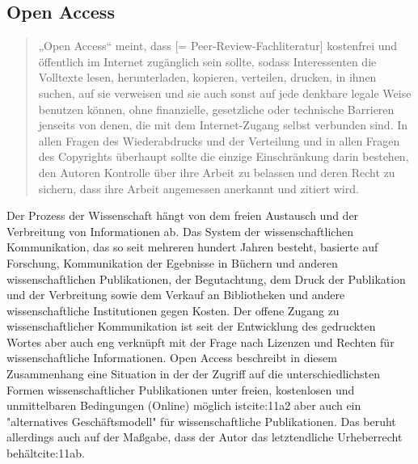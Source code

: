 \subsection{Open Access} 
\begin{quote}
„Open Access“ meint, dass [= Peer-Review-Fachliteratur] kostenfrei und öffentlich im Internet zugänglich sein sollte, sodass Interessenten die Volltexte lesen, herunterladen, kopieren, verteilen, drucken, in ihnen suchen, auf sie verweisen und sie auch sonst auf jede denkbare legale Weise benutzen können, ohne finanzielle, gesetzliche oder technische Barrieren jenseits von denen, die mit dem Internet-Zugang selbst verbunden sind. In allen Fragen des Wiederabdrucks und der Verteilung und in allen Fragen des Copyrights überhaupt sollte die einzige Einschränkung darin bestehen, den Autoren Kontrolle über ihre Arbeit zu belassen und deren Recht zu sichern, dass ihre Arbeit angemessen anerkannt und zitiert wird.
\cite{boai_2012}\end{quote}
Der Prozess der Wissenschaft hängt von dem freien Austausch und der Verbreitung von Informationen ab\cite{cite:11}. Das System der wissenschaftlichen Kommunikation, das so seit mehreren hundert Jahren besteht, basierte auf Forschung, Kommunikation der Egebnisse in Büchern und anderen wissenschaftlichen Publikationen, der Begutachtung, dem Druck der Publikation und der Verbreitung sowie dem Verkauf an Bibliotheken und andere wissenschaftliche Institutionen gegen Kosten\cite{cite:11a}. Der offene Zugang zu wissenschaftlicher Kommunikation ist seit der Entwicklung des gedruckten Wortes aber auch eng verknüpft mit der Frage nach Lizenzen und Rechten für wissenschaftliche Informationen\cite{boai_2012}. Open Access beschreibt in diesem Zusammenhang eine Situation in der der Zugriff auf die unterschiedlichsten Formen wissenschaftlicher Publikationen unter freien, kostenlosen und unmittelbaren Bedingungen (Online) möglich ist{cite:11a2} aber auch ein "alternatives Geschäftsmodell"\cite{lewis_2012_inevitability} für wissenschaftliche Publikationen. Das beruht allerdings auch auf der Maßgabe, dass der Autor das letztendliche Urheberrecht behält{cite:11ab}.

